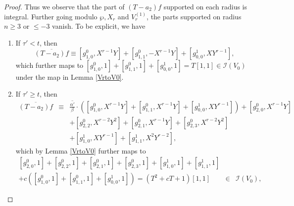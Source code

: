 \documentclass[11pt, reqno]{amsart}
\numberwithin{equation}{section}
\theoremstyle{definition}
\theoremstyle{remark}
\theoremstyle{definition}
\theoremstyle{remark}
\theoremstyle{remark}
\begin{document}
\begin{proof}
Thus we observe that the part of $(T-a_2)f $ supported on each radius is integral. Further going modulo $\wp,X_{r}$ and $V_{r}^{(1)}$, the parts supported on radius $n\geq 3$ or $\leq -3$ vanish. %
To be explicit, we have  
\begin{enumerate}
\item  %
 If $\tau'<t$, then
 $$\overline{(T-a_{2})f} \equiv \left[ g_{1,0}^{0}, X^{r-1}Y \right]
+ \left[ g_{1,1}^{0}, -X^{r-1}Y\right] +\left[g_{0,0}^1, XY^{r-1}\right],$$
which further maps to $\left[ g_{1,0}^{0}, 1 \right]
+ \left[ g_{1,1}^{0}, 1\right] +\left[g_{0,0}^1, 1\right]
     =T[1,1] \in \mathcal{I}(V_{0})$ under the map in Lemma \ref{VrtoV0}.
     \hspace{20mm}
\item If  $\tau'\geq t$, then \begin{eqnarray*}
\overline{(T-a_{2})f} &\equiv& \overline{\frac{\alpha'}{\beta}} \cdot \left(\left[g_{1,0}^{0}, X^{r-1}Y\right] + \left[g_{1,1}^{0}, X^{r-1}Y\right] + \left[g_{0,0}^{1}, XY^{r-1}\right]\right) 
+\left[g_{2,0}^{0}, X^{r-1}Y  \right] \\
&& + \left[g_{2,2}^{0},X^{r-2}Y^2  \right] 
+ \left[g_{2,1}^{0},X^{r-1}Y  \right]
+\left[g_{2,3}^{0},X^{r-2}Y^2 \right] \\
&& + \left[g_{1,0}^{1}, XY^{r-1} \right] + \left[g_{1,1}^{1}, X^{2}Y^{r-2}  \right],  
\end{eqnarray*}
which by Lemma \ref{VrtoV0} further maps to 
\begin{eqnarray*}
\left[g_{2,0}^{0}, 1 \right] + \left[g_{2,2}^{0},1 \right] + \left[g_{2,1}^{0},1  \right]
+\left[g_{2,3}^{0},1\right] + \left[g_{1,0}^{1}, 1 \right] + \left[g_{1,1}^{1}, 1\right]&&\\ + c\left(\left[g_{1,0}^{0},1\right] + \left[g_{1,1}^{0}, 1\right]+\left[g_{0,0}^1, 1\right] \right) 
= \left(T^2 + cT + 1 \right)\left[1,1 \right] &\in& \mathcal{I}(V_{0}), 

\end{eqnarray*}
\end{enumerate}
\end{proof}
\end{document}
